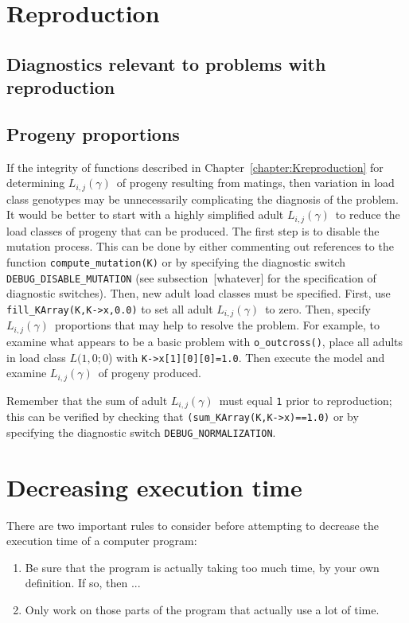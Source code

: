 \documentclass[12pt,twoside,letterpaper,fleqn]{report}
\numberwithin{equation}{section}  %
\newcommand{\LCG}[3]{\mbox{$L(#1,#2;#3$)}}
\newcommand{\Lijg}{\mbox{$L_{i,j}(\gamma)$}}     %
\begin{document}
{\section{Reproduction}

\subsection{Diagnostics relevant to problems with reproduction}

\subsection{Progeny proportions}

If the integrity of functions described in Chapter~\ref{chapter:Kreproduction}
for determining \Lijg\ of progeny resulting from matings, then variation in
load class genotypes may be unnecessarily complicating the diagnosis of the
problem.  It would be better to start with a highly simplified adult \Lijg\ to
reduce the load classes of progeny that can be produced.  The first step is to
disable the mutation process.  This can be done by either commenting out
references to the function \lstinline{compute_mutation(K)} or by specifying the
diagnostic switch \lstinline{DEBUG_DISABLE_MUTATION} (see subsection~[whatever]
for the specification of diagnostic switches).  Then, new adult load classes
must be specified.  First, use \lstinline{fill_KArray(K,K->x,0.0)} to set all
adult \Lijg\ to zero.  Then, specify \Lijg\ proportions that may help to
resolve the problem.  For example, to examine what appears to be a basic
problem with \lstinline{o_outcross()}, place all adults in load class
\LCG{1}{0}{0} with \lstinline{K->x[1][0][0]=1.0}.  Then execute the model and
examine \Lijg\ of progeny produced.

Remember that the sum of adult \Lijg\ must equal \lstinline{1} prior to
reproduction; this can be verified by checking that
\lstinline{(sum_KArray(K,K->x)==1.0)} or by specifying the diagnostic switch
\lstinline{DEBUG_NORMALIZATION}.

\section{Decreasing execution time}

There are two important rules to consider before attempting to decrease the
execution time of a computer program:

\begin{enumerate}
	\item \label{ruletoomuch} Be sure that the program is actually taking too much time, by your own definition.  If so, then ...
	\item \label{rulefocus} Only work on those parts of the program that actually use a lot of time.
\end{enumerate}

}
\end{document}
